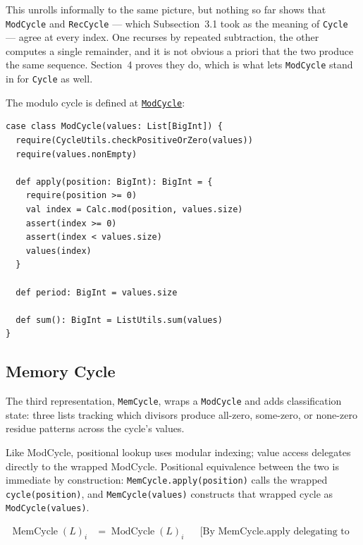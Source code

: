 This unrolls informally to the same picture, but nothing so far shows that
\texttt{ModCycle} and \texttt{RecCycle} --- which Subsection~3.1 took as the
meaning of \texttt{Cycle} --- agree at every index. One recurses by repeated
subtraction, the other computes a single remainder, and it is not obvious a
priori that the two produce the same sequence. Section~4 proves they do, which
is what lets \texttt{ModCycle} stand in for \texttt{Cycle} as well.

The modulo cycle is defined at
\href{https://github.com/thiagomata/prime-numbers/blob/cycle-article-v1.0.0/src/main/scala/v1/chapter4/cycle/mod/ModCycle.scala}{\texttt{ModCycle}}:

\begin{lstlisting}[style=scala]
case class ModCycle(values: List[BigInt]) {
  require(CycleUtils.checkPositiveOrZero(values))
  require(values.nonEmpty)

  def apply(position: BigInt): BigInt = {
    require(position >= 0)
    val index = Calc.mod(position, values.size)
    assert(index >= 0)
    assert(index < values.size)
    values(index)
  }

  def period: BigInt = values.size

  def sum(): BigInt = ListUtils.sum(values)
}
\end{lstlisting}

\subsection{Memory Cycle}

The third representation, \texttt{MemCycle}, wraps a \texttt{ModCycle} and
adds classification state: three lists tracking which divisors produce
all-zero, some-zero, or none-zero residue patterns across the cycle's values.

Like ModCycle, positional lookup uses modular indexing; value access delegates
directly to the wrapped ModCycle. Positional equivalence between the two is
immediate by construction: \texttt{MemCycle.apply(position)} calls the wrapped
\texttt{cycle(position)}, and \texttt{MemCycle(values)} constructs that wrapped
cycle as \texttt{ModCycle(values)}.

\begin{equation*}
\begin{aligned}
\operatorname{MemCycle}(L)_i
  &= \operatorname{ModCycle}(L)_i
  && \text{[By MemCycle.apply delegating to its wrapped ModCycle]}
\end{aligned}
\end{equation*}

